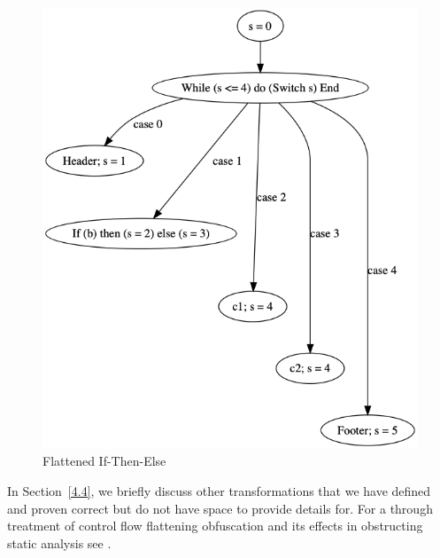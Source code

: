 \documentclass[compsoc,conference,a4paper,10pt,times]{IEEEtran}
\begin{document}
\begin{figure}[hbt]
\centering
\includegraphics[scale=0.27]{ifElseFlat}
\caption{Flattened If-Then-Else}
 \label{fig:flatIfElse}
\end{figure}
%

In Section~\ref{4.4}, we briefly discuss other transformations that we have defined and proven correct but do not have space to provide details for.
For a through treatment of control flow flattening obfuscation and its effects in obstructing static analysis see \cite{Wang}. 


\end{document}

